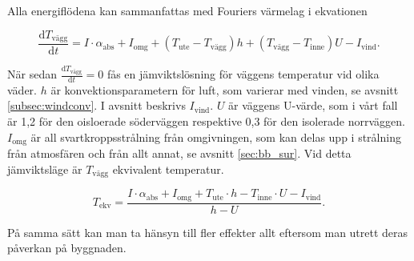 Alla energiflödena kan sammanfattas med Fouriers värmelag i ekvationen 

\begin{equation}
\label{eq:ekvtemp}
\frac{\mathrm{d}T_\text{vägg}}{\mathrm{d}t} = 
I\cdot \alpha_\text{abs} + I_\text{omg} + (T_\text{ute} - T_\text{vägg}) h +( T_\text{vägg} - T_\text{inne} ) U - I_\text{vind}.
\end{equation}

När sedan $\frac{\mathrm{d}T_\text{vägg}}{\mathrm{d}t}=0$ fås en jämviktslösning för väggens temperatur vid olika väder. $h$ är konvektionsparametern för luft, som varierar med vinden, se avsnitt \ref{subsec:windconv}. I avsnitt \label{subsec:darcy} beskrivs $I_\text{vind}$.
$U$ är väggens U-värde, som i vårt fall är 1,2 för den oisloerade söderväggen respektive 0,3 för den isolerade norrväggen. $I_\text{omg}$ är all svartkroppsstrålning från omgivningen, som kan delas upp i strålning från atmosfären och från allt annat, se avsnitt \ref{sec:bb_sur}. Vid detta jämviktsläge är $T_\text{vägg}$ ekvivalent temperatur.

\begin{equation}\boxed{ \; \; \;
\label{eq:ekvtemp}
T_\text{ekv} = 
\frac{I\cdot \alpha_\text{abs} + I_\text{omg} + T_\text{ute} \cdot h - T_\text{inne} \cdot U - I_\text{vind}}{h-U}.
\; \; \;}\end{equation}

På samma sätt kan man ta hänsyn till fler effekter allt eftersom man utrett deras påverkan på byggnaden.
